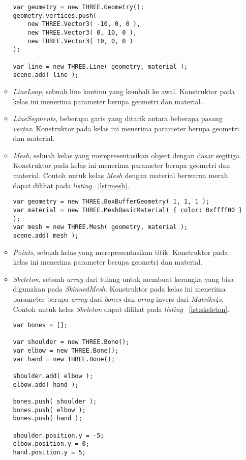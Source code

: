 \begin{itemize}
\begin{itemize}
\begin{lstlisting}[caption={Contoh penggunaan kelas {\it Line}.}, label={lst:line},captionpos=b]
var geometry = new THREE.Geometry();
geometry.vertices.push(
	new THREE.Vector3( -10, 0, 0 ),
	new THREE.Vector3( 0, 10, 0 ),
	new THREE.Vector3( 10, 0, 0 )
);

var line = new THREE.Line( geometry, material );
scene.add( line );
\end{lstlisting}
		\item {\it LineLoop}, sebuah line kontinu yang kembali ke awal. Konstruktor pada kelas ini menerima parameter berupa geometri dan material.
		\item {\it LineSegments}, beberapa garis yang ditarik antara beberapa pasang {\it vertex}. Konstruktor pada kelas ini menerima parameter berupa geometri dan material.
		\item {\it Mesh}, sebuah kelas yang merepresentasikan object dengan dasar segitiga. Konstruktor pada kelas ini menerima parameter berupa geometri dan material. Contoh untuk kelas {\it Mesh} dengan material berwarna merah dapat dilihat pada {\it listing} ~\ref{lst:mesh}.
\begin{lstlisting}[caption={Contoh penggunaan kelas {\it Mesh}.}, label={lst:mesh},captionpos=b]
var geometry = new THREE.BoxBufferGeometry( 1, 1, 1 );
var material = new THREE.MeshBasicMaterial( { color: 0xffff00 } );
var mesh = new THREE.Mesh( geometry, material );
scene.add( mesh );
\end{lstlisting}
		\item {\it Points}, sebuah kelas yang merepresentasikan titik. Konstruktor pada kelas ini menerima parameter berupa geometri dan material.
		\item {\it Skeleton}, sebuah {\it array} dari tulang untuk membuat kerangka yang bisa digunakan pada {\it SkinnedMesh}. Konstruktor pada kelas ini menerima parameter berupa {\it array} dari {\it bones} dan {\it array} invers dari {\it Matriks4s}. Contoh untuk kelas {\it Skeleton} dapat dilihat pada {\it listing} ~\ref{lst:skeleton}.
\begin{lstlisting}[caption={Contoh penggunaan kelas {\it Skeleton}.}, label={lst:skeleton},captionpos=b]
var bones = [];

var shoulder = new THREE.Bone();
var elbow = new THREE.Bone();
var hand = new THREE.Bone();

shoulder.add( elbow );
elbow.add( hand );

bones.push( shoulder );
bones.push( elbow );
bones.push( hand );

shoulder.position.y = -5;
elbow.position.y = 0;
hand.position.y = 5;


\end{lstlisting}
\end{itemize}
\end{itemize}
